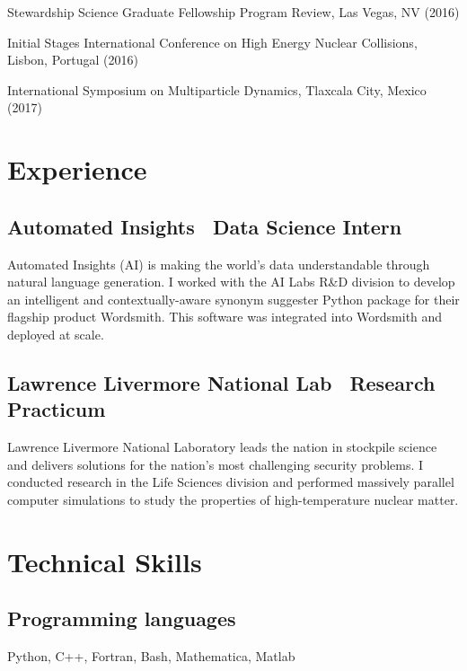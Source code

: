 \documentclass[letterpaper,10pt]{article}
\begin{document}
\begin{multicols}{2}
Stewardship Science Graduate Fellowship Program Review, Las Vegas, NV (2016)

Initial Stages International Conference on High Energy Nuclear Collisions, Lisbon, Portugal (2016)

International Symposium on Multiparticle Dynamics, Tlaxcala City, Mexico (2017)

\columnbreak

\section{Experience}

\subsection{Automated Insights \textbar\ Data Science Intern}

Automated Insights (AI) is making the world's data understandable through natural language generation.
I worked with the AI Labs R\&D division to develop an intelligent and contextually-aware synonym suggester Python package for their flagship product Wordsmith.
This software was integrated into Wordsmith and deployed at scale.

\subsection{Lawrence Livermore National Lab \textbar\ Research Practicum}

Lawrence Livermore National Laboratory leads the nation in stockpile science and delivers solutions for the nation's most challenging security problems.
I conducted research in the Life Sciences division and performed massively parallel computer simulations to study the properties of high-temperature nuclear matter.

\section{Technical Skills}

\subsection{Programming languages}
\smallskip

Python, C++, Fortran, Bash, Mathematica, Matlab


\end{multicols}
\end{document}
